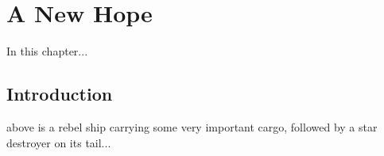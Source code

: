 \chapter{A New Hope}
	\label{chapter:a-new-hope}



\begin{synopsis}
	In this chapter...
\end{synopsis}


\section{Introduction}

 above is a rebel ship carrying some very important cargo, followed by a star destroyer on its tail...\cite{Lorch1969}

